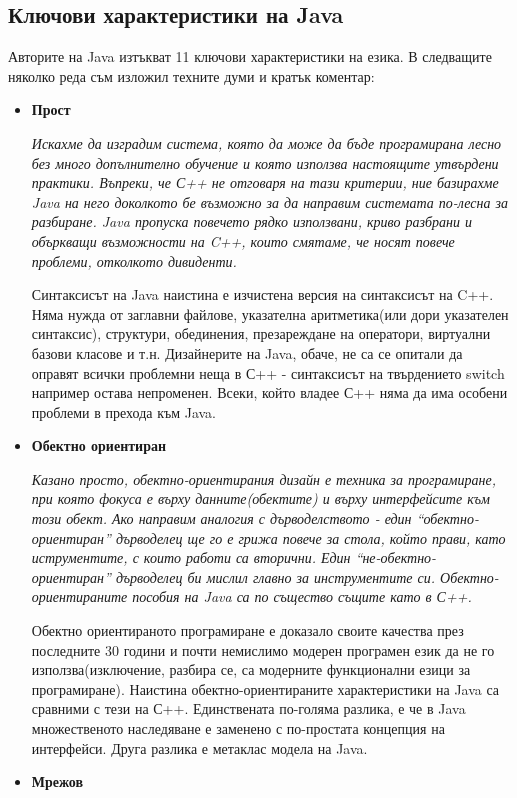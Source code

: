 \subsection{Ключови характеристики на Java}
Авторите на Java изтъкват 11 ключови характеристики на езика. В
следващите няколко реда съм изложил техните думи и кратък коментар:
\begin{itemize}
\item \textbf{Прост}
 
  \emph{Искахме да изградим система, която да може да бъде програмирана
    лесно без много допълнително обучение и която използва настоящите
    утвърдени практики. Въпреки, че С++ не отговаря на тази критерии,
    ние базирахме Java на него доколкото бе възможно за да направим
    системата по-лесна за разбиране. Java пропуска повечето рядко
    използвани, криво разбрани и объркващи възможности на C++, които
    смятаме, че носят повече проблеми, отколкото дивиденти.}

  Синтаксисът на Java наистина е изчистена версия на синтаксисът на
  C++. Няма нужда от заглавни файлове, указателна аритметика(или дори
  указателен синтаксис), структури, обединения, презареждане на
  оператори, виртуални базови класове и т.н. Дизайнерите на Java,
  обаче, не са се опитали да оправят всички проблемни неща в С++ -
  синтаксисът на твърдението switch например остава непроменен. Всеки,
  който владее С++ няма да има особени проблеми в прехода към Java.
\item \textbf{Обектно ориентиран}

    \emph{Казано просто, обектно-ориентирания дизайн е техника за
    програмиране, при която фокуса е върху данните(обектите) и върху
    интерфейсите към този обект. Ако направим аналогия с
    дърводелството - един "`обектно-ориентиран"' дърводелец ще го е
    грижа повече за стола, който прави, като иструментите, с които
    работи са вторични. Един "`не-обектно-ориентиран"' дърводелец би
    мислил главно за инструментите си. Обектно-ориентираните пособия
    на Java са по същество същите като в С++.}

  Обектно ориентираното програмиране е доказало своите качества през
  последните 30 години и почти немислимо модерен програмен език да не
  го използва(изключение, разбира се, са модерните функционални езици
  за програмиране). Наистина обектно-ориентираните характеристики на
  Java са сравними с тези на С++. Единствената по-голяма разлика, е че
  в Java множественото наследяване е заменено с по-простата концепция
  на интерфейси. Друга разлика е метаклас модела на Java.
  \item \textbf{Мрежов}


\end{itemize}
